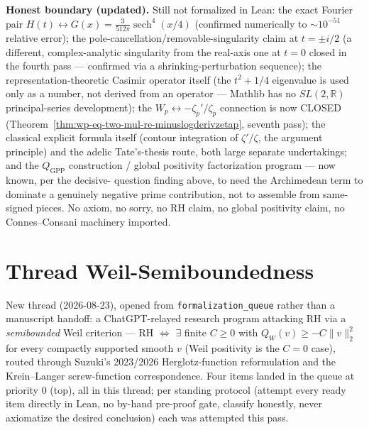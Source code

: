 \documentclass{report}
\theoremstyle{definition}
\begin{document}
\textbf{Honest boundary (updated).} Still not formalized in Lean: the exact Fourier
pair $H(t)\leftrightarrow G(x)=\tfrac{3}{512\pi}\operatorname{sech}^4(x/4)$ (confirmed
numerically to $\sim10^{-51}$ relative error); the pole-cancellation/removable-singularity
claim at $t=\pm i/2$ (a different, complex-analytic singularity from the real-axis one at
$t=0$ closed in the fourth pass --- confirmed via a shrinking-perturbation sequence); the
representation-theoretic Casimir operator itself (the $t^2+1/4$ eigenvalue is used only
as a number, not derived from an operator --- Mathlib has no $SL(2,\mathbb{R})$
principal-series development); the $W_p\leftrightarrow-\zeta_p'/\zeta_p$ connection is now
CLOSED (Theorem~\ref{thm:wp-eq-two-mul-re-minuslogderivzetap}, seventh pass); the classical explicit
formula itself (contour integration of $\zeta'/\zeta$, the argument principle) and the
adelic Tate's-thesis route, both large separate undertakings; and the $Q_{\mathrm{GPP}}$
construction / global positivity factorization program --- now known, per the decisive-
question finding above, to need the Archimedean term to dominate a genuinely negative
prime contribution, not to assemble from same-signed pieces. No axiom, no sorry,
no RH claim, no global positivity claim, no Connes--Consani machinery imported.

\chapter{Thread Weil-Semiboundedness}

New thread (2026-08-23), opened from \texttt{formalization\_queue} rather than a manuscript
handoff: a ChatGPT-relayed research program attacking RH via a \emph{semibounded} Weil
criterion --- RH $\iff$ $\exists$ finite $C\ge0$ with $Q_W(v)\ge -C\|v\|_2^2$ for every
compactly supported smooth $v$ (Weil positivity is the $C=0$ case), routed through Suzuki's
2023/2026 Herglotz-function reformulation and the Krein--Langer screw-function
correspondence. Four items landed in the queue at priority 0 (top), all in this thread; per
standing protocol (attempt every ready item directly in Lean, no by-hand pre-proof gate,
classify honestly, never axiomatize the desired conclusion) each was attempted this pass.
\end{document}
